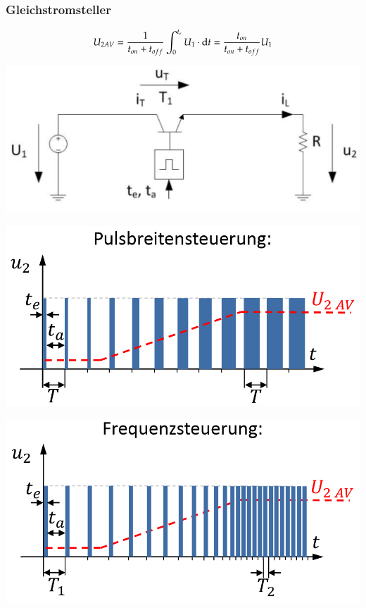 \subsubsection{Gleichstromsteller}
\begin{minipage}{0.5\linewidth}
\[ U_{2AV}=\frac{1}{t_{on}+t_{off}}\int_{0}^{t_e}U_1\cdot \mathop{}\!\mathrm{d} t = \frac{t_{on}}{t_{on}+t_{off}}U_1 \]
\end{minipage}
\begin{minipage}{0.4\linewidth}
\includegraphics[width=1.2\linewidth]{images/GsSteller}
\end{minipage}

\begin{minipage}{0.5\linewidth}
    \includegraphics[width=0.8\linewidth]{images/GsStellerPuls}
\end{minipage}
\begin{minipage}{0.5\linewidth}
    \includegraphics[width=0.8\linewidth]{images/GsStellerFreq}
\end{minipage}

